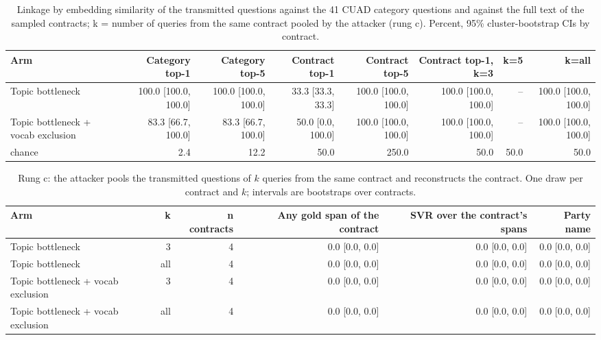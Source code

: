 \begin{table}[t]
\centering\small
\caption{Linkage by embedding similarity of the transmitted questions against the 41 CUAD category questions and against the full text of the sampled contracts; k = number of queries from the same contract pooled by the attacker (rung c). Percent, 95\% cluster-bootstrap CIs by contract.}
\label{tab:linkage}
\begin{tabular}{lrrrrrrr}
\toprule
Arm & Category top-1 & Category top-5 & Contract top-1 & Contract top-5 & Contract top-1, k=3 & k=5 & k=all \\
\midrule
Topic bottleneck & 100.0 [100.0, 100.0] & 100.0 [100.0, 100.0] & 33.3 [33.3, 33.3] & 100.0 [100.0, 100.0] & 100.0 [100.0, 100.0] & -- & 100.0 [100.0, 100.0] \\
Topic bottleneck + vocab exclusion & 83.3 [66.7, 100.0] & 83.3 [66.7, 100.0] & 50.0 [0.0, 100.0] & 100.0 [100.0, 100.0] & 100.0 [100.0, 100.0] & -- & 100.0 [100.0, 100.0] \\
chance & 2.4 & 12.2 & 50.0 & 250.0 & 50.0 & 50.0 & 50.0 \\
\bottomrule
\end{tabular}
\end{table}

\begin{table}[t]
\centering\small
\caption{Rung c: the attacker pools the transmitted questions of $k$ queries from the same contract and reconstructs the contract. One draw per contract and $k$; intervals are bootstraps over contracts.}
\label{tab:multiquery}
\begin{tabular}{lrrrrr}
\toprule
Arm & k & n contracts & Any gold span of the contract & SVR over the contract's spans & Party name \\
\midrule
Topic bottleneck & 3 & 4 & 0.0 [0.0, 0.0] & 0.0 [0.0, 0.0] & 0.0 [0.0, 0.0] \\
Topic bottleneck & all & 4 & 0.0 [0.0, 0.0] & 0.0 [0.0, 0.0] & 0.0 [0.0, 0.0] \\
Topic bottleneck + vocab exclusion & 3 & 4 & 0.0 [0.0, 0.0] & 0.0 [0.0, 0.0] & 0.0 [0.0, 0.0] \\
Topic bottleneck + vocab exclusion & all & 4 & 0.0 [0.0, 0.0] & 0.0 [0.0, 0.0] & 0.0 [0.0, 0.0] \\
\bottomrule
\end{tabular}
\end{table}

